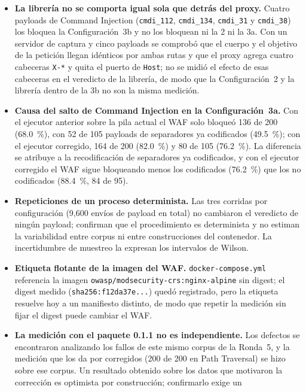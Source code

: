 \begin{itemize}
    La atribución al WAF coincide, categoría por categoría, con lo medido por separado en la 3a,
    pero no es un cruce determinista.
    \item \textbf{La librería no se comporta igual sola que detrás del proxy.} Cuatro payloads de
    Command Injection (\texttt{cmdi\_112}, \texttt{cmdi\_134}, \texttt{cmdi\_31} y
    \texttt{cmdi\_38}) los bloquea la Configuración~3b y no los bloquean ni la 2 ni la 3a. Con
    un servidor de captura y cinco payloads se comprobó que el cuerpo y el objetivo de la petición
    llegan idénticos por ambas rutas y que el proxy agrega cuatro cabeceras \texttt{X-*} y quita el
    puerto de \texttt{Host}; no se midió el
    efecto de esas cabeceras en el veredicto de la librería, de modo que la Configuración~2 y la
    librería dentro de la 3b no son la misma medición.
    \item \textbf{Causa del salto de Command Injection en la Configuración~3a.} Con el ejecutor
    anterior sobre la pila actual el WAF solo bloqueó 136 de 200 (68.0~\%), con 52 de 105 payloads
    de separadores ya codificados (49.5~\%); con el ejecutor corregido, 164 de 200 (82.0~\%) y 80 de
    105 (76.2~\%). La diferencia se atribuye a la recodificación de separadores ya codificados, y
    con el ejecutor corregido el WAF sigue bloqueando menos los codificados (76.2~\%) que los
    no codificados (88.4~\%, 84 de 95).
    \item \textbf{Repeticiones de un proceso determinista.} Las tres corridas por configuración
    (9{,}600 envíos de payload en total) no cambiaron el veredicto de ningún payload; confirman que
    el procedimiento es determinista y no estiman la variabilidad entre corpus ni entre
    construcciones del contenedor. La incertidumbre de muestreo la expresan los intervalos de
    Wilson.
    \item \textbf{Etiqueta flotante de la imagen del WAF.} \texttt{docker-compose.yml} referencia la
    imagen \texttt{owasp/modsecurity-crs:nginx-alpine} sin digest; el digest medido
    (\texttt{sha256:f12da37e...}) quedó registrado, pero la etiqueta resuelve hoy a un manifiesto
    distinto, de modo que repetir la medición sin fijar el digest puede cambiar el WAF.
    \item \textbf{La medición con el paquete 0.1.1 no es independiente.} Los defectos se
    encontraron analizando los fallos de este mismo corpus de la Ronda~5, y la medición que los da
    por corregidos (200 de 200 en Path Traversal) se hizo sobre ese corpus. Un resultado obtenido
    sobre los datos que motivaron la corrección es optimista por construcción; confirmarlo exige un

\end{itemize}
